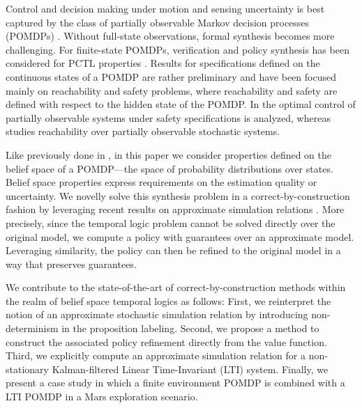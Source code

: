 \documentclass{ifacconf}
\begin{document}
Control and decision making under motion and sensing uncertainty is best captured by the class of partially observable Markov decision processes (POMDPs) \citep{Kaelbling98,Smallwood73}. Without full-state observations, formal synthesis becomes more challenging. For finite-state POMDPs, verification and policy synthesis has been considered for PCTL properties \citep{Norman2017, Chatterjee2014}. Results for specifications defined on the continuous states of a POMDP are rather preliminary and have been focused mainly on reachability and safety problems, where reachability and safety are defined with respect to the hidden state of the POMDP. In \citep{ding2013optimal} the optimal control of partially observable systems under safety specifications is analyzed, whereas \citep{LESSER20141989} studies reachability over partially observable stochastic systems.

Like previously done in  \citep{Vasile2016,JonesDTL2013}, in this paper we consider properties defined on the belief space of a POMDP---the space of probability distributions over states. Belief space properties express requirements on the estimation quality or uncertainty. We novelly solve this synthesis problem in a  correct-by-construction fashion by leveraging recent results on  approximate simulation relations \citep{haesaert2017verification, tech_report_TACAS}.
More precisely, since the temporal logic problem cannot be solved directly over the original model, we compute a policy with guarantees over an approximate model. Leveraging similarity, the policy can then be refined to the original model in a way that preserves guarantees.

We contribute to the state-of-the-art of correct-by-construction methods within the realm of belief space temporal logics as follows: First, we reinterpret the notion of an approximate stochastic simulation relation by introducing non-determinism in the proposition labeling. Second, we propose a method to construct the associated policy refinement directly from the value function. Third, we explicitly compute an approximate simulation relation for a non-stationary Kalman-filtered Linear Time-Invariant (LTI) system. Finally, we present a case study in which a finite environment POMDP is combined with a LTI POMDP in a Mars exploration scenario.

\end{document}
